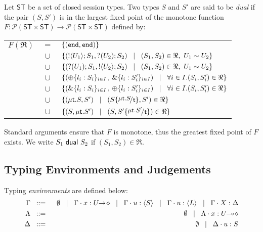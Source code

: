 \begin{definition}[Duality]
\label{def:dual}
Let $\mathsf{ST}$ be a set of closed session types. 
Two types $S$ and $S'$ are said to be {\em dual} if the pair $(S,S')$ is 
in the largest fixed point of the monotone function
$F:\mathcal{P}(\mathsf{ST}\times \mathsf{ST}) \to 
\mathcal{P}(\mathsf{ST}\times \mathsf{ST})$ defined by:\\ %
\begin{tabular}{rcl}
$F(\Re)$ &$\!\!=\!\!$&	$\{(\mathtt{end}, \mathtt{end})\}$\\
         &$\!\!\cup\!\!$&	$\{(! \langle U_1 \rangle ; S_1, ? (U_2) ; S_2)
\;\;\;|\;\;\;(S_1, S_2)\in \Re, \  U_1 \sim U_2 \}$\\ 
       &$\!\!\cup\!\!$&	$\{(? (U_1) ; S_1, ! \langle U_2 \rangle ; S_2)
\;\;\;|\;\;\;(S_1, S_2)\in \Re, \ U_1 \sim U_2\}$\\ 
	&$\!\!\cup\!\!$&	$\{(\oplus \{l_i: S_i\}_{i \in I} \,,\, \& \{l_i: S_i'\}_{i \in I}) \;\;\;|\;\;\; \forall i\in I. (S_i, S_i')\in \Re\}$\\
	&$\!\!\cup\!\!$&	$\{(\& \{l_i: S_i\}_{i \in I}\,,\, \oplus \{l_i: S_i'\}_{i \in I}) \;\;\;|\;\;\; \forall i\in I. (S_i, S_i')\in \Re\}$\\
	&$\!\!\cup\!\!$&	$\set{(\trec{t}{S}, S')
\bnfbar (S\subst{\trec{t}{S}}{\vart{t}},S')\in \Re}$\\
	&$\!\!\cup\!\!$&	$\set{(S,\trec{t}{S'})
\bnfbar (S,S'\subst{\trec{t}{S'}}{\vart{t}})\in \Re}$\\[1mm]
\end{tabular}

\noindent
Standard arguments ensure that $F$ is monotone, thus the greatest fixed point
of $F$ exists. We write $S_1 \ \mathsf{dual}\  S_2$ if  $(S_1,S_2)\in \Re$. 
\end{definition}


\subsection{Typing Environments and Judgements}
\noi Typing \emph{environments} are defined below:
\begin{eqnarray*}
	\Gamma  & \;\;::=\;\;  &\emptyset \;\;\;|\;\;\; \Gamma \cdot x: U\!\! \rightarrow\! \diamond \;\;\;|\;\;\; \Gamma \cdot u: \langle S \rangle \;\;\;|\;\;\; \Gamma \cdot u: \langle L \rangle 
        \;\;\;|\;\;\; \Gamma \cdot X: \Delta \\
	\Lambda &\;\;::=\;\; & \emptyset \;\;\;|\;\;\; \Lambda \cdot x : U\!\! \multimap\! \diamond \\
	\Delta   &\;\;::=\;\; &  \emptyset \;\;\;|\;\;\; \Delta \cdot u : S
\end{eqnarray*}

